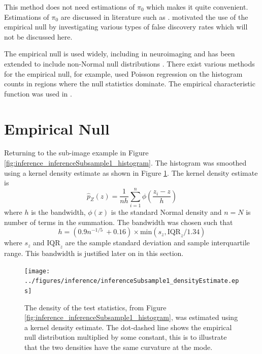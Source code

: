 This method does not need estimations of $\pi_0$ which makes it quite convenient. Estimations of $\pi_0$ are discussed in literature such as \cite{benjamini2000adaptive, pounds2003estimating, storey2003statistical, pounds2004improving, langaas2005estimating, durnez2014posthoc}. \cite{efron2004large} motivated the use of the empirical null by investigating various types of false discovery rates \citep{storey2002direct, storey2003positive, efron2002empirical, efron2007size} which will not be discussed here.

The empirical null is used widely, including in neuroimaging \citep{schwartzman2008false, schwartzman2009empirical} and has been extended to include non-Normal null distributions \citep{schwartzman2008false, schwartzman2008empirical}. There exist various methods for the empirical null, for example, \cite{schwartzman2008empirical} used Poisson regression on the histogram counts in regions where the null statistics dominate. The empirical characteristic function was used in \cite{jin2007estimating}.

\section{Empirical Null}

Returning to the sub-image example in Figure \ref{fig:inference_inferenceSubsample1_histogram}. The histogram was smoothed using a kernel density estimate \citep{parzen1962on, friedman2001elements} as shown in Figure \ref{fig:inference_inferenceSubsample1_densityEstimate}. The kernel density estimate \citep{parzen1962on} is
\begin{equation}
  \widehat{p}_Z(z)=
  \frac{1}{nh}
  \sum_{i=1}^n\phi\left(
    \dfrac{z_i-z}{h}
  \right)
  \label{eq:inference_kernel_density_estimate}
\end{equation}
where $h$ is the bandwidth, $\phi(x)$ is the standard Normal density and $n=N$ is number of terms in the summation. The bandwidth was chosen such that
\begin{equation}
  h = (0.9n^{-1/5}\ + 0.16) \times \text{min}\left(s_z,\text{IQR}_z/1.34\right)
  \label{eq:inference_ourruleofthumb}
\end{equation}
where $s_z$ and $\text{IQR}_z$ are the sample standard deviation and sample interquartile range. This bandwidth is justified later on in this section.

\begin{figure}
  \centering
  \texttt{[image: ../figures/inference/inferenceSubsample1\_densityEstimate.eps]}
  \caption{The density of the test statistics, from Figure \ref{fig:inference_inferenceSubsample1_histogram}, was estimated using a kernel density estimate. The dot-dashed line shows the empirical null distribution multiplied by some constant, this is to illustrate that the two densities have the same curvature at the mode.}
  \label{fig:inference_inferenceSubsample1_densityEstimate}
\end{figure}

